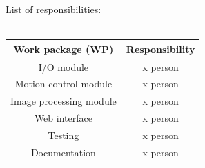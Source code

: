 \documentclass[11pt]{article}
\begin{document}
List of responsibilities: \\\\
\begin{tabular}{ |c|c| }
    \hline
    \textbf{Work package (WP)} & \textbf{Responsibility} \\
    \hline
    I/O module & x person \\
    \hline
    Motion control module & x person \\
    \hline
    Image processing module & x person \\
    \hline
    Web interface & x person \\
    \hline
    Testing & x person \\
    \hline
    Documentation & x person \\
    \hline
\end{tabular}
\end{document}
